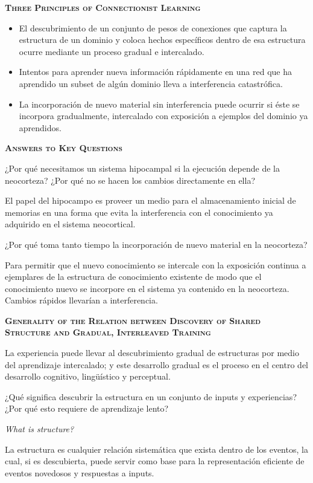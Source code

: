 \documentclass[a4paper,12pt]{article}
\begin{document}
{\scshape\bfseries Three Principles of Connectionist Learning}

\begin{itemize}
	\item El descubrimiento de un conjunto de pesos de conexiones que captura la estructura de un dominio y coloca hechos específicos dentro de esa estructura ocurre mediante un proceso gradual e intercalado.
	\item Intentos para aprender nueva información rápidamente en una red que ha aprendido un subset de algún dominio lleva a interferencia catastrófica.
	\item La incorporación de nuevo material sin interferencia puede ocurrir si éste se incorpora gradualmente, intercalado con exposición a ejemplos del dominio ya aprendidos.
\end{itemize}

{\scshape\bfseries Answers to Key Questions}

¿Por qué necesitamos un sistema hipocampal si la ejecución depende de la neocorteza? ¿Por qué no se hacen los cambios directamente en ella?

El papel del hipocampo es proveer un medio para el almacenamiento inicial de memorias en una forma que evita la interferencia con el conocimiento ya adquirido en el sistema neocortical.

¿Por qué toma tanto tiempo la incorporación de nuevo material en la neocorteza?

Para permitir que el nuevo conocimiento se intercale con la exposición continua a ejemplares de la estructura de conocimiento existente de modo que el conocimiento nuevo se incorpore en el sistema ya contenido en la neocorteza. Cambios rápidos llevarían a interferencia.

{\scshape\bfseries Generality of the Relation between Discovery of Shared Structure and Gradual, Interleaved Training}

La experiencia puede llevar al descubrimiento gradual de estructuras por medio del aprendizaje intercalado; y este desarrollo gradual es el proceso en el centro del desarrollo cognitivo, lingüístico y perceptual. 

¿Qué significa descubrir la estructura en un conjunto de inputs y experiencias? ¿Por qué esto requiere de aprendizaje lento?

{\itshape What is structure?}

La estructura es cualquier relación sistemática que exista dentro de los eventos, la cual, si es descubierta, puede servir como base para la representación eficiente de eventos novedosos y respuestas a inputs.
\end{document}
